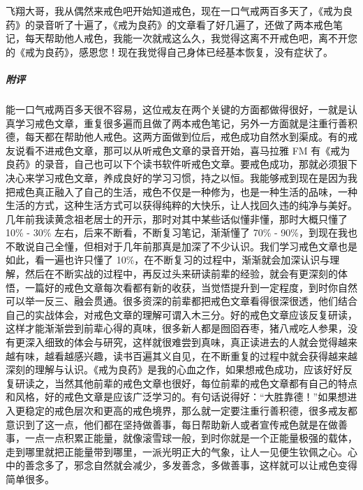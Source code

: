\begin{case}
    飞翔大哥，我从偶然来戒色吧开始知道戒色，现在一口气戒两百多天了，《戒为良药》的录音听了十遍了，《戒为良药》的文章看了好几遍了，还做了两本戒色笔记，每天帮助他人戒色，我能一次就戒这么久，我觉得这离不开戒色吧，离不开您的《戒为良药》，感恩您！现在我觉得自己身体已经基本恢复，没有症状了。
    \subparagraph{附评} 能一口气戒两百多天很不容易，这位戒友在两个关键的方面都做得很好，一就是认真学习戒色文章，重复很多遍而且做了两本戒色笔记，另外一方面就是注重行善积德，每天都在帮助他人戒色。这两方面做到位后，戒色成功自然水到渠成。有的戒友说看不进戒色文章，那可以从听戒色文章的录音开始，喜马拉雅 FM 有《戒为良药》的录音，自己也可以下个读书软件听戒色文章。要戒色成功，那就必须狠下决心来学习戒色文章，养成良好的学习习惯，持之以恒。我能够戒到现在是因为我把戒色真正融入了自己的生活，戒色不仅是一种修为，也是一种生活的品味，一种生活的方式，这种生活方式可以获得纯粹的大快乐，让人找回久违的纯净与美好。几年前我读黄念祖老居士的开示，那时对其中某些话似懂非懂，那时大概只懂了 10\% - 30\% 左右，后来不断看，不断复习笔记，渐渐懂了 70\% - 90\%，到现在我也不敢说自己全懂，但相对于几年前那真是加深了不少认识。我们学习戒色文章也是如此，看一遍也许只懂了 10\%，在不断复习的过程中，渐渐就会加深认识与理解，然后在不断实战的过程中，再反过头来研读前辈的经验，就会有更深刻的体悟，一篇好的戒色文章每次看都有新的收获，当觉悟提升到一定程度，到时你自然可以举一反三、融会贯通。很多资深的前辈都把戒色文章看得很深很透，他们结合自己的实战体会，对戒色文章的理解可谓入木三分。好的戒色文章应该反复研读，这样才能渐渐尝到前辈心得的真味，很多新人都是囫囵吞枣，猪八戒吃人参果，没有更深入细致的体会与研究，这样就很难尝到真味，真正读进去的人就会觉得越来越有味，越看越感兴趣，读书百遍其义自见，在不断重复的过程中就会获得越来越深刻的理解与认识。《戒为良药》是我的心血之作，如果想戒色成功，应该好好反复研读之，当然其他前辈的戒色文章也很好，每位前辈的戒色文章都有自己的特点和风格，好的戒色文章是应该广泛学习的。有句话说得好：“大胜靠德！”如果想进入更稳定的戒色层次和更高的戒色境界，那么就一定要注重行善积德，很多戒友都意识到了这一点，他们都在坚持做善事，每日帮助新人或者宣传戒色就是在做善事，一点一点积累正能量，就像滚雪球一般，到时你就是一个正能量极强的载体，走到哪里就把正能量带到哪里，一派光明正大的气象，让人一见便生钦佩之心。心中的善念多了，邪念自然就会减少，多发善念，多做善事，这样就可以让戒色变得简单很多。
\end{case}

